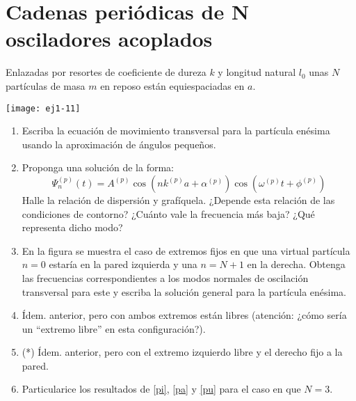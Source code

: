 \section*{Cadenas periódicas de N osciladores acoplados}


\item \label{anterior}
\begin{minipage}[t][1cm]{0.45\textwidth}
Enlazadas por resortes de coeficiente de dureza $k$ y longitud natural $l_0$ unas $N$ partículas de masa $m$ en reposo están equiespaciadas en $a$.
\end{minipage}
\begin{minipage}[c][1.5cm][t]{0.5\textwidth}
  \texttt{[image: ej1-11]}
\end{minipage}
\begin{enumerate}
	\item Escriba la ecuación de movimiento transversal para la partícula enésima usando la aproximación de ángulos pequeños.
	\item Proponga una solución de la forma:
	\[
		\Psi_{n}^{(p)}(t)=A^{(p)}\cos\left(nk^{(p)}a+\alpha^{(p)}\right)\cos\left(\omega^{(p)}t+\phi^{(p)}\right)
	\]
	Halle la relación de dispersión y grafíquela.
	¿Depende esta relación de las condiciones de contorno?
	¿Cuánto vale la frecuencia más baja?
	¿Qué representa dicho modo? 
	\item \label{pi} En la figura se muestra el caso de extremos fijos en que una virtual partícula $n=0$ estaría en la pared izquierda y una $n= N+1$ en la derecha.
	Obtenga las frecuencias correspondientes a los modos normales de oscilación transversal para este y escriba la solución general para la partícula enésima. 
	\item \label{pa} Ídem. anterior, pero con ambos extremos están libres (atención: ¿cómo sería un ``extremo libre'' en esta configuración?).
	\item \label{pu} (*) Ídem. anterior, pero con el extremo izquierdo libre y el derecho fijo a la pared. 
	\item Particularice los resultados de \ref{pi}, \ref{pa} y \ref{pu} para el caso en que \(N = 3\).
\end{enumerate}



